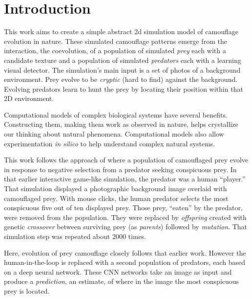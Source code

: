 \documentclass[letterpaper]{article}
\newcommand{\jargon}[1]{\textit{#1}}
\begin{document}
\section{Introduction}
This work aims to create a simple abstract 2d simulation model of camouflage evolution in nature. These simulated camouflage patterns emerge from the interaction, the coevolution, of a population of simulated \jargon{prey} each with a candidate texture and a population of simulated \jargon{predators} each with a learning visual detector. The simulation's main input is a set of photos of a background environment. Prey evolve to be \jargon{cryptic} (hard to find) against the background. Evolving predators learn to hunt the prey by locating their position within that 2D environment.
\par
Computational models of complex biological systems have several benefits. Constructing them, making them work as observed in nature, helps crystallize our thinking about natural phenomena. Computational models also allow experimentation \textit{in silico} to help understand complex natural systems.
\par
This work follows the approach of \citet{reynolds_iec_2011} where a population of camouflaged prey evolve in response to negative selection from a predator seeking conspicuous prey. In that earlier interactive game-like simulation, the predator was a human “player.” That simulation displayed a photographic background image overlaid with camouflaged prey. With mouse clicks, the human predator selects the most conspicuous five out of ten displayed prey. Those prey, “eaten” by the predator, were removed from the population.  They were replaced by \jargon{offspring} created with genetic \jargon{crossover} between surviving prey (as \jargon{parents}) followed by \jargon{mutation}. That simulation step was repeated about 2000 times.
\par
Here, evolution of prey camouflage closely follows that earlier work. However the human-in-the-loop is replaced with a second population of predators, each based on a deep neural network. These CNN networks take an image as input and produce a \jargon{prediction}, an estimate, of where in the image the most conspicuous prey is located.
\par
\end{document}
